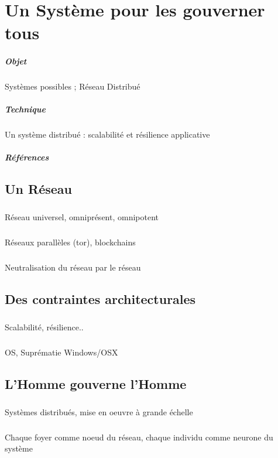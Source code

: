 \chapter{Un Système pour les gouverner tous}
\paragraph{Objet} Systèmes possibles ; Réseau Distribué
\paragraph{Technique} Un système distribué : scalabilité et résilience applicative
\paragraph{Références}
\cite{Deleuze:0}
\cite{Foucault:0}
\cite{Negri:0}
\cite{Pieces:0}
\cite{ProgrammableCity:0}
\cite{ProgrammableCity:1}
\cite{PsychoPass}

\section{Un Réseau}
\paragraph{} Réseau universel, omniprésent, omnipotent
\paragraph{} Réseaux parallèles (tor), blockchains
\paragraph{} Neutralisation du réseau par le réseau

\section{Des contraintes architecturales}
\paragraph{} Scalabilité, résilience..
\paragraph{} OS, Suprématie Windows/OSX

\section{L'Homme gouverne l'Homme}
\paragraph{} Systèmes distribués, mise en oeuvre à grande échelle
\paragraph{} Chaque foyer comme noeud du réseau, chaque individu comme neurone du système